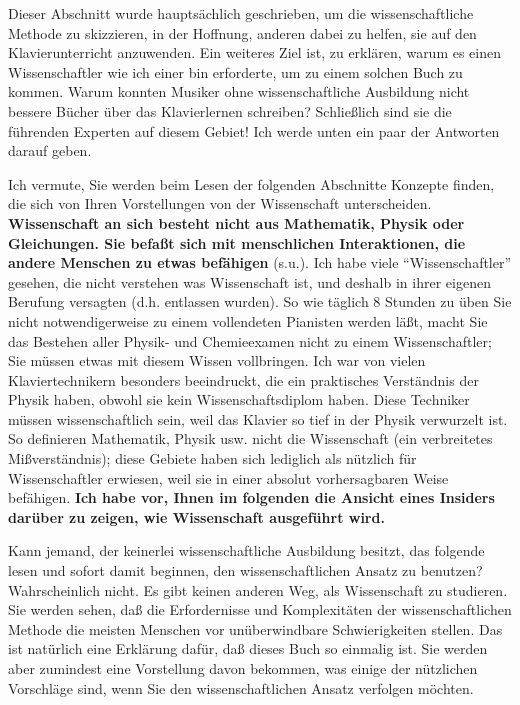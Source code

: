 Dieser Abschnitt wurde hauptsächlich geschrieben, um die wissenschaftliche Methode zu skizzieren, in der Hoffnung, anderen dabei zu helfen, sie auf den Klavierunterricht anzuwenden.
Ein weiteres Ziel ist, zu erklären, warum es einen Wissenschaftler wie ich einer bin erforderte, um zu einem solchen Buch zu kommen.
Warum konnten Musiker ohne wissenschaftliche Ausbildung nicht bessere Bücher über das Klavierlernen schreiben?
Schließlich sind sie die führenden Experten auf diesem Gebiet!
Ich werde unten ein paar der Antworten darauf geben.

Ich vermute, Sie werden beim Lesen der folgenden Abschnitte Konzepte finden, die sich von Ihren Vorstellungen von der Wissenschaft unterscheiden.
\textbf{Wissenschaft an sich besteht nicht aus Mathematik, Physik oder Gleichungen.
Sie befaßt sich mit menschlichen Interaktionen, die andere Menschen zu etwas befähigen} (s.u.).
Ich habe viele \enquote{Wissenschaftler} gesehen, die nicht verstehen was Wissenschaft ist, und deshalb in ihrer eigenen Berufung versagten (d.h. entlassen wurden).
So wie täglich 8 Stunden zu üben Sie nicht notwendigerweise zu einem vollendeten Pianisten werden läßt, macht Sie das Bestehen aller Physik- und Chemieexamen nicht zu einem Wissenschaftler; Sie müssen etwas mit diesem Wissen vollbringen.
Ich war von vielen Klaviertechnikern besonders beeindruckt, die ein praktisches Verständnis der Physik haben, obwohl sie kein Wissenschaftsdiplom haben.
Diese Techniker müssen wissenschaftlich sein, weil das Klavier so tief in der Physik verwurzelt ist.
So definieren Mathematik, Physik usw. nicht die Wissenschaft (ein verbreitetes Mißverständnis); diese Gebiete haben sich lediglich als nützlich für Wissenschaftler erwiesen, weil sie in einer absolut vorhersagbaren Weise befähigen.
\textbf{Ich habe vor, Ihnen im folgenden die Ansicht eines Insiders darüber zu zeigen, wie Wissenschaft ausgeführt wird.}

Kann jemand, der keinerlei wissenschaftliche Ausbildung besitzt, das folgende lesen und sofort damit beginnen, den wissenschaftlichen Ansatz zu benutzen?
Wahrscheinlich nicht.
Es gibt keinen anderen Weg, als Wissenschaft zu studieren.
Sie werden sehen, daß die Erfordernisse und Komplexitäten der wissenschaftlichen Methode die meisten Menschen vor unüberwindbare Schwierigkeiten stellen.
Das ist natürlich eine Erklärung dafür, daß dieses Buch so einmalig ist.
Sie werden aber zumindest eine Vorstellung davon bekommen, was einige der nützlichen Vorschläge sind, wenn Sie den wissenschaftlichen Ansatz verfolgen möchten.

